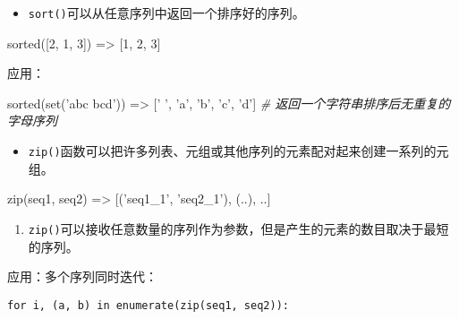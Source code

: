 \documentclass[utf-8]{ctexart}
\newenvironment{Shaded}{}{}
\newcommand{\DecValTok}[1]{\textcolor[rgb]{0.25,0.63,0.44}{#1}}
\newcommand{\StringTok}[1]{\textcolor[rgb]{0.25,0.44,0.63}{#1}}
\newcommand{\CommentTok}[1]{\textcolor[rgb]{0.38,0.63,0.69}{\textit{#1}}}
\newcommand{\OperatorTok}[1]{\textcolor[rgb]{0.40,0.40,0.40}{#1}}
\newcommand{\BuiltInTok}[1]{#1}
\newcommand{\NormalTok}[1]{#1}
\begin{document}
\begin{itemize}
\item
  \texttt{sort()}可以从任意序列中返回一个排序好的序列。
\end{itemize}

\begin{Shaded}
\begin{Highlighting}[]
\BuiltInTok{sorted}\NormalTok{([}\DecValTok{2}\NormalTok{, }\DecValTok{1}\NormalTok{, }\DecValTok{3}\NormalTok{]) }\OperatorTok{=>}\NormalTok{ [}\DecValTok{1}\NormalTok{, }\DecValTok{2}\NormalTok{, }\DecValTok{3}\NormalTok{]}
\end{Highlighting}
\end{Shaded}

应用：

\begin{Shaded}
\begin{Highlighting}[]
\BuiltInTok{sorted}\NormalTok{(}\BuiltInTok{set}\NormalTok{(}\StringTok{'abc bcd'}\NormalTok{)) }\OperatorTok{=>}\NormalTok{ [}\StringTok{' '}\NormalTok{,}
\StringTok{'a'}\NormalTok{, }\StringTok{'b'}\NormalTok{, }\StringTok{'c'}\NormalTok{, }\StringTok{'d'}\NormalTok{]}
\CommentTok{# 返回一个字符串排序后无重复的字母序列}
\end{Highlighting}
\end{Shaded}

\begin{itemize}
\item
  \texttt{zip()}函数可以把许多列表、元组或其他序列的元素配对起来创建一系列的元组。
\end{itemize}

\begin{Shaded}
\begin{Highlighting}[]
\BuiltInTok{zip}\NormalTok{(seq1, seq2) }\OperatorTok{=>}\NormalTok{ [(}\StringTok{'seq1_1'}\NormalTok{, }\StringTok{'seq2_1'}\NormalTok{), (..), ..]}
\end{Highlighting}
\end{Shaded}

\begin{enumerate}
\def\labelenumi{\arabic{enumi}.}
\item
  \texttt{zip()}可以接收任意数量的序列作为参数，但是产生的元素的数目取决于最短的序列。
\end{enumerate}

应用：多个序列同时迭代：

\begin{verbatim}
for i, (a, b) in enumerate(zip(seq1, seq2)):
\end{verbatim}
\end{document}
